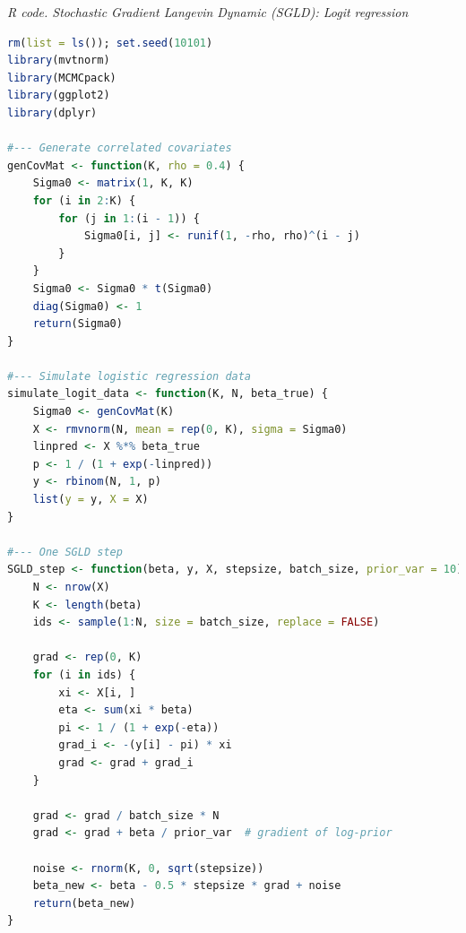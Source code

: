 \begin{tcolorbox}[enhanced,width=4.67in,center upper,
	fontupper=\large\bfseries,drop shadow southwest,sharp corners]
	\textit{R code. Stochastic Gradient Langevin Dynamic (SGLD): Logit regression}
	\begin{VF}
		\begin{lstlisting}[language=R]
rm(list = ls()); set.seed(10101)
library(mvtnorm)
library(MCMCpack)
library(ggplot2)
library(dplyr)

#--- Generate correlated covariates
genCovMat <- function(K, rho = 0.4) {
	Sigma0 <- matrix(1, K, K)
	for (i in 2:K) {
		for (j in 1:(i - 1)) {
			Sigma0[i, j] <- runif(1, -rho, rho)^(i - j)
		}
	}
	Sigma0 <- Sigma0 * t(Sigma0)
	diag(Sigma0) <- 1
	return(Sigma0)
}

#--- Simulate logistic regression data
simulate_logit_data <- function(K, N, beta_true) {
	Sigma0 <- genCovMat(K)
	X <- rmvnorm(N, mean = rep(0, K), sigma = Sigma0)
	linpred <- X %*% beta_true
	p <- 1 / (1 + exp(-linpred))
	y <- rbinom(N, 1, p)
	list(y = y, X = X)
}

#--- One SGLD step
SGLD_step <- function(beta, y, X, stepsize, batch_size, prior_var = 10) {
	N <- nrow(X)
	K <- length(beta)
	ids <- sample(1:N, size = batch_size, replace = FALSE)
	
	grad <- rep(0, K)
	for (i in ids) {
		xi <- X[i, ]
		eta <- sum(xi * beta)
		pi <- 1 / (1 + exp(-eta))
		grad_i <- -(y[i] - pi) * xi
		grad <- grad + grad_i
	}
	
	grad <- grad / batch_size * N
	grad <- grad + beta / prior_var  # gradient of log-prior
	
	noise <- rnorm(K, 0, sqrt(stepsize))
	beta_new <- beta - 0.5 * stepsize * grad + noise
	return(beta_new)
}
\end{lstlisting}
	\end{VF}
\end{tcolorbox}

